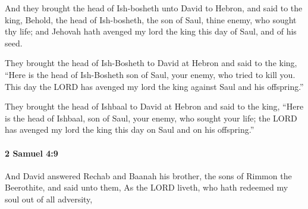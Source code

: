 			\begin{versebox}
					\item[BHS] 
					\item[ASV] And they brought the head of Ish-bosheth unto David to Hebron, and said to the king, Behold, the head of Ish-bosheth, the son of Saul, thine enemy, who sought thy life; and Jehovah hath avenged my lord the king this day of Saul, and of his seed.
					\item[NIV] They brought the head of Ish-Bosheth to David at Hebron and said to the king, “Here is the head of Ish-Bosheth son of Saul, your enemy, who tried to kill you. This day the LORD has avenged my lord the king against Saul and his offspring.”
					\item[NRSV] They brought the head of Ishbaal to David at Hebron and said to the king, “Here is the head of Ishbaal, son of Saul, your enemy, who sought your life; the LORD has avenged my lord the king this day on Saul and on his offspring.”
			\end{versebox}

		\paragraph{2 Samuel 4:9} %
			\label{2SAMUEL-4-9}

			And David answered Rechab and Baanah his brother, the sons of Rimmon the Beerothite, and said unto them, As the LORD liveth, who hath redeemed my soul out of all adversity,

